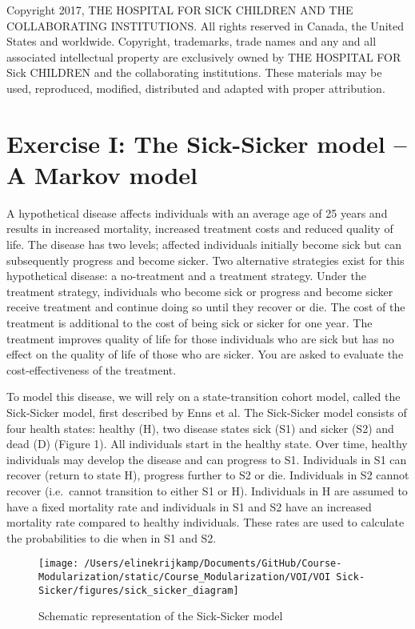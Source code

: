 \documentclass[]{article}
\begin{document}
Copyright 2017, THE HOSPITAL FOR SICK CHILDREN AND THE COLLABORATING
INSTITUTIONS. All rights reserved in Canada, the United States and
worldwide. Copyright, trademarks, trade names and any and all associated
intellectual property are exclusively owned by THE HOSPITAL FOR Sick
CHILDREN and the collaborating institutions. These materials may be
used, reproduced, modified, distributed and adapted with proper
attribution.

\section{Exercise I: The Sick-Sicker model -- A Markov
model}\label{exercise-i-the-sick-sicker-model-a-markov-model}

A hypothetical disease affects individuals with an average age of 25
years and results in increased mortality, increased treatment costs and
reduced quality of life. The disease has two levels; affected
individuals initially become sick but can subsequently progress and
become sicker. Two alternative strategies exist for this hypothetical
disease: a no-treatment and a treatment strategy. Under the treatment
strategy, individuals who become sick or progress and become sicker
receive treatment and continue doing so until they recover or die. The
cost of the treatment is additional to the cost of being sick or sicker
for one year. The treatment improves quality of life for those
individuals who are sick but has no effect on the quality of life of
those who are sicker. You are asked to evaluate the cost-effectiveness
of the treatment.

To model this disease, we will rely on a state-transition cohort model,
called the Sick-Sicker model, first described by Enns et al. The
Sick-Sicker model consists of four health states: healthy (H), two
disease states sick (S1) and sicker (S2) and dead (D) (Figure 1). All
individuals start in the healthy state. Over time, healthy individuals
may develop the disease and can progress to S1. Individuals in S1 can
recover (return to state H), progress further to S2 or die. Individuals
in S2 cannot recover (i.e.~cannot transition to either S1 or H).
Individuals in H are assumed to have a fixed mortality rate and
individuals in S1 and S2 have an increased mortality rate compared to
healthy individuals. These rates are used to calculate the probabilities
to die when in S1 and S2.

\begin{figure}

{\centering \texttt{[image: /Users/elinekrijkamp/Documents/GitHub/Course-Modularization/static/Course\_Modularization/VOI/VOI Sick-Sicker/figures/sick\_sicker\_diagram]} 

}

\caption{Schematic representation of the Sick-Sicker model}\label{fig:unnamed-chunk-1}
\end{figure}
\end{document}
